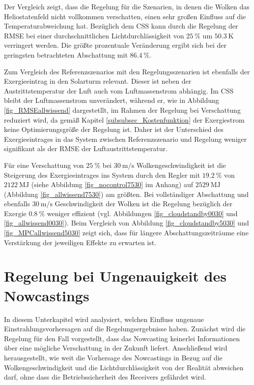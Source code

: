 Der Vergleich zeigt, dass die Regelung für die Szenarien, in denen die Wolken das Heliostatenfeld nicht vollkommen verschatten, einen sehr großen Einfluss auf die Temperaturabweichung hat.
Bezüglich dem CSS kann durch die Regelung der RMSE bei einer durchschnittlichen Lichtdurchlässigkeit von $\SI{25}{\percent}$ um $\SI{50.3}{\kelvin}$ verringert werden.
Die größte prozentuale Veränderung ergibt sich bei der geringsten betrachteten Abschattung mit $\SI{86.4}{\percent}$.

Zum Vergleich des Referenzszenarios mit den Regelungsszenarien ist ebenfalls der Exergieeintrag in den Solarturm relevant.
Dieser ist neben der Austrittstemperatur der Luft auch vom Luftmassenstrom abhängig.
Im CSS bleibt der Luftmassenstrom unverändert, während er, wie in Abbildung \ref{fig_RMSEallwissend} dargestetllt, im Rahmen der Regelung bei Verschattung reduziert wird, da gemäß Kapitel \ref{subsubsec_Kostenfunktion} der Exergiestrom keine Optimierungsgröße der Regelung ist.
Daher ist der Unterschied des Exergieeintrages in das System zwischen Referenzszenario und Regelung weniger signifikant als der RMSE der Luftaustrittstemperatur.

Für eine Verschattung von $\SI{25}{\percent}$ bei $\SI{30}{\metre\per\second}$ Wolkengeschwindigkeit ist die Steigerung des Exergieeintrages ins System durch den Regler mit $\SI{19.2}{\percent}$ von $\SI{2122}{\mega\joule}$ (siehe Abbildung \ref{fig_nocontrol7530} im Anhang) auf $\SI{2529}{\mega\joule}$ (Abbildung \ref{fig_allwissend7530}) am größten.
Bei vollständiger Abschattung und ebenfalls $\SI{30}{\metre\per\second}$ Geschwindigkeit der Wolken ist die Regelung bezüglich der Exergie $\SI{0.8}{\percent}$ weniger effizient (vgl. Abbildungen \ref{fig_cloudstandby0030} und \ref{fig_allwissend0030}).
Beim Vergleich von Abbildung \ref{fig_cloudstandby5030} und \ref{fig_MPCallwissend5030} zeigt sich, dass für längere Abschattungszeiträume eine Verstärkung der jeweiligen Effekte zu erwarten ist.


\section{Regelung bei Ungenauigkeit des Nowcastings} \label{sec_Ungenauigkeit}
In diesem Unterkapitel wird analysiert, welchen Einfluss ungenaue Einstrahlungsvorhersagen auf die Regelungsergebnisse haben.
Zunächst wird die Regelung für den Fall vorgestellt, dass das Nowcasting keinerlei Informationen über eine mögliche Verschattung in der Zukunft liefert.
Anschließend wird herausgestellt, wie weit die Vorhersage des Nowcastings in Bezug auf die Wolkengeschwindigkeit und die Lichtdurchlässigkeit von der Realität abweichen darf, ohne dass die Betriebssicherheit des Receivers gefährdet wird.

